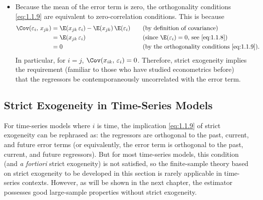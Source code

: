 \begin{itemize}
The point here is that strict exogeneity requires the regressors be orthogonal
not only to the error term from the same observation (i.e.,
$\E(x_{ik}\,\varepsilon_i) = 0$ for all~$k$), but also to the error term from
the other observations (i.e., $\E(x_{jk}\,\varepsilon_i) = 0$ for all~$k$ and
for $j \neq i$).

\item Because the mean of the error term is zero, the orthogonality conditions
\eqref{eq:1.1.9} are equivalent to zero-correlation conditions.  This is
because
\begin{align*}
  \Cov(\varepsilon_i,\, x_{jk})
    &= \E(x_{jk}\,\varepsilon_i) - \E(x_{jk})\,\E(\varepsilon_i)
       &\quad&\text{(by definition of covariance)} \\
    &= \E(x_{jk}\,\varepsilon_i)
       &&\text{(since $\E(\varepsilon_i) = 0$, see \eqref{eq:1.1.8})} \\
    &= 0
       &&\text{(by the orthogonality conditions \eqref{eq:1.1.9})}.
\end{align*}
In particular, for $i = j$, $\Cov(x_{ik},\, \varepsilon_i) = 0$.  Therefore,
strict exogeneity implies the requirement (familiar to those who have studied
econometrics before) that the regressors be contemporaneously uncorrelated with
the error term.
\end{itemize}

\subsection*{Strict Exogeneity in Time-Series Models}

For time-series models where $i$ is time, the implication \eqref{eq:1.1.9} of
strict exogeneity can be rephrased as: the regressors are orthogonal to the
past, current, and future error terms (or equivalently, the error term is
orthogonal to the past, current, and future regressors).  But for most
time-series models, this condition (and \emph{a fortiori} strict exogeneity) is
not satisfied, so the finite-sample theory based on strict exogeneity to be
developed in this section is rarely applicable in time-series contexts.
However, as will be shown in the next chapter, the estimator possesses good
large-sample properties without strict exogeneity.

